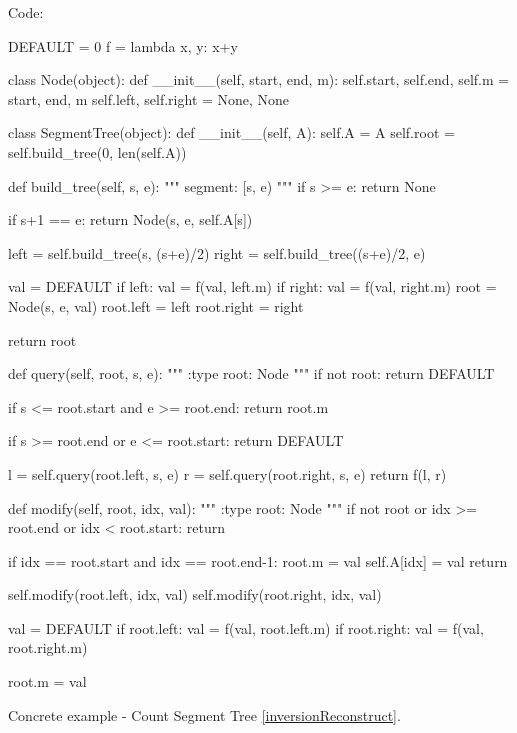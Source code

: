 Code:
\begin{python}
DEFAULT = 0
f = lambda x, y: x+y


class Node(object):
    def __init__(self, start, end, m):
        self.start, self.end, self.m = start, end, m
        self.left, self.right = None, None


class SegmentTree(object):
    def __init__(self, A):
        self.A = A
        self.root = self.build_tree(0, len(self.A))

    def build_tree(self, s, e):
        """
        segment: [s, e)
        """
        if s >= e:
            return None

        if s+1 == e:
            return Node(s, e, self.A[s])

        left = self.build_tree(s, (s+e)/2)
        right = self.build_tree((s+e)/2, e)

        val = DEFAULT
        if left: val = f(val, left.m)
        if right: val = f(val, right.m)
        root = Node(s, e, val)
        root.left = left
        root.right = right

        return root

    def query(self, root, s, e):
        """
        :type root: Node
        """
        if not root:
            return DEFAULT

        if s <= root.start and e >= root.end:
            return root.m

        if s >= root.end or e <= root.start:
            return DEFAULT

        l = self.query(root.left, s, e)
        r = self.query(root.right, s, e)
        return f(l, r)

    def modify(self, root, idx, val):
        """
        :type root: Node
        """
        if not root or idx >= root.end or idx < root.start:
            return

        if idx == root.start and idx == root.end-1:
            root.m = val
            self.A[idx] = val
            return

        self.modify(root.left, idx, val)
        self.modify(root.right, idx, val)

        val = DEFAULT
        if root.left:  val = f(val, root.left.m)
        if root.right: val = f(val, root.right.m)
        
        root.m = val
\end{python}
Concrete example - Count Segment Tree \ref{inversionReconstruct}. 
        
     
